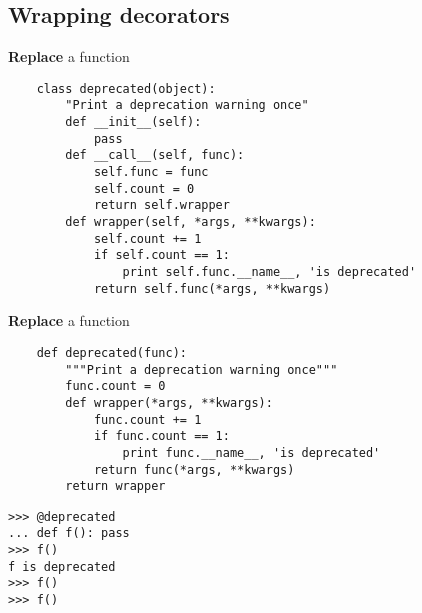 \documentclass{beamer}
\begin{document}
\subsection{Wrapping decorators}

\begin{frame}[fragile]{\textbf{Replace} a function}
  \begin{verbatim}
    class deprecated(object):
        "Print a deprecation warning once"
        def __init__(self):
            pass
        def __call__(self, func):
            self.func = func
            self.count = 0
            return self.wrapper
        def wrapper(self, *args, **kwargs):
            self.count += 1
            if self.count == 1:
                print self.func.__name__, 'is deprecated'
            return self.func(*args, **kwargs)
  \end{verbatim}
\end{frame}

\begin{frame}[fragile]{\textbf{Replace} a function}
  \begin{verbatim}
    def deprecated(func):
        """Print a deprecation warning once"""
        func.count = 0
        def wrapper(*args, **kwargs):
            func.count += 1
            if func.count == 1:
                print func.__name__, 'is deprecated'
            return func(*args, **kwargs)
        return wrapper
  \end{verbatim}

  \pause
  \begin{verbatim}
>>> @deprecated
... def f(): pass
>>> f()
f is deprecated
>>> f()
>>> f()
  \end{verbatim}
\end{frame}

\end{document}
